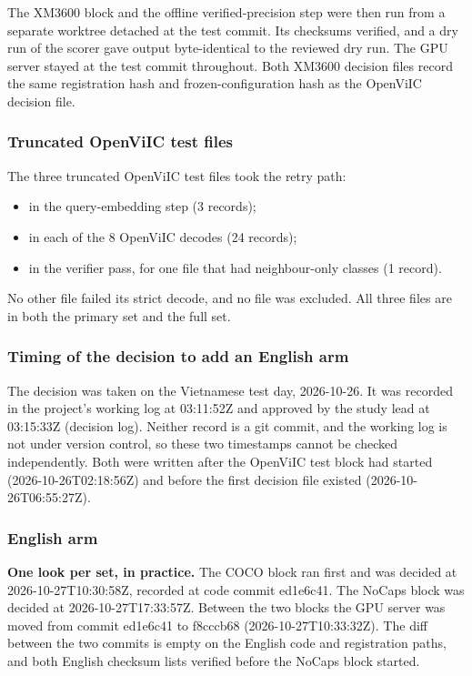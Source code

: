 The XM3600 block and the offline verified-precision step were then run from a separate worktree
detached at the test commit. Its checksums verified, and a dry run of the scorer gave output
byte-identical to the reviewed dry run. The GPU server stayed at the test commit throughout. Both
XM3600 decision files record the same registration hash and frozen-configuration hash as the
OpenViIC decision file.

\subsubsection{Truncated OpenViIC test files}\label{truncated-openviic-test-files}

The three truncated OpenViIC test files took the retry path:

\begin{itemize}
\tightlist
\item
  in the query-embedding step (3 records);
\item
  in each of the 8 OpenViIC decodes (24 records);
\item
  in the verifier pass, for one file that had neighbour-only classes (1 record).
\end{itemize}

No other file failed its strict decode, and no file was excluded. All three files are in both the
primary set and the full set.

\subsubsection{Timing of the decision to add an English
arm}\label{timing-of-the-decision-to-add-an-english-arm}

The decision was taken on the Vietnamese test day, 2026-10-26. It was recorded in the project's
working log at 03:11:52Z and approved by the study lead at 03:15:33Z (decision log). Neither record
is a git commit, and the working log is not under version control, so these two timestamps cannot be
checked independently. Both were written after the OpenViIC test block had started
(2026-10-26T02:18:56Z) and before the first decision file existed (2026-10-26T06:55:27Z).

\subsubsection{English arm}\label{english-arm}

\textbf{One look per set, in practice.} The COCO block ran first and was decided at
2026-10-27T10:30:58Z, recorded at code commit ed1e6c41. The NoCaps block was decided at
2026-10-27T17:33:57Z. Between the two blocks the GPU server was moved from commit ed1e6c41 to
f8cccb68 (2026-10-27T10:33:32Z). The diff between the two commits is empty on the English code and
registration paths, and both English checksum lists verified before the NoCaps block started.

